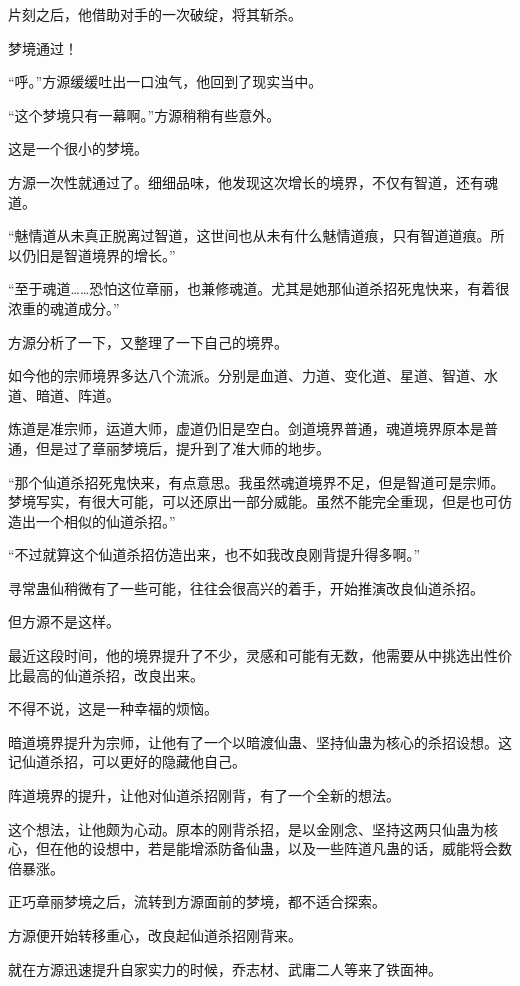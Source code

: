 \begin{this_body}
片刻之后，他借助对手的一次破绽，将其斩杀。

梦境通过！

“呼。”方源缓缓吐出一口浊气，他回到了现实当中。

“这个梦境只有一幕啊。”方源稍稍有些意外。

这是一个很小的梦境。

方源一次性就通过了。细细品味，他发现这次增长的境界，不仅有智道，还有魂道。

“魅情道从未真正脱离过智道，这世间也从未有什么魅情道痕，只有智道道痕。所以仍旧是智道境界的增长。”

“至于魂道……恐怕这位章丽，也兼修魂道。尤其是她那仙道杀招死鬼快来，有着很浓重的魂道成分。”

方源分析了一下，又整理了一下自己的境界。

如今他的宗师境界多达八个流派。分别是血道、力道、变化道、星道、智道、水道、暗道、阵道。

炼道是准宗师，运道大师，虚道仍旧是空白。剑道境界普通，魂道境界原本是普通，但是过了章丽梦境后，提升到了准大师的地步。

“那个仙道杀招死鬼快来，有点意思。我虽然魂道境界不足，但是智道可是宗师。梦境写实，有很大可能，可以还原出一部分威能。虽然不能完全重现，但是也可仿造出一个相似的仙道杀招。”

“不过就算这个仙道杀招仿造出来，也不如我改良刚背提升得多啊。”

寻常蛊仙稍微有了一些可能，往往会很高兴的着手，开始推演改良仙道杀招。

但方源不是这样。

最近这段时间，他的境界提升了不少，灵感和可能有无数，他需要从中挑选出性价比最高的仙道杀招，改良出来。

不得不说，这是一种幸福的烦恼。

暗道境界提升为宗师，让他有了一个以暗渡仙蛊、坚持仙蛊为核心的杀招设想。这记仙道杀招，可以更好的隐藏他自己。

阵道境界的提升，让他对仙道杀招刚背，有了一个全新的想法。

这个想法，让他颇为心动。原本的刚背杀招，是以金刚念、坚持这两只仙蛊为核心，但在他的设想中，若是能增添防备仙蛊，以及一些阵道凡蛊的话，威能将会数倍暴涨。

正巧章丽梦境之后，流转到方源面前的梦境，都不适合探索。

方源便开始转移重心，改良起仙道杀招刚背来。

就在方源迅速提升自家实力的时候，乔志材、武庸二人等来了铁面神。


\end{this_body}
